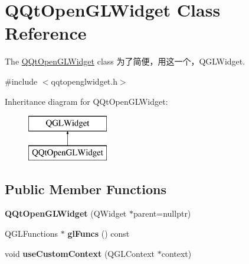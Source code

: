 \hypertarget{class_q_qt_open_g_l_widget}{}\section{Q\+Qt\+Open\+G\+L\+Widget Class Reference}
\label{class_q_qt_open_g_l_widget}


The \mbox{\hyperlink{class_q_qt_open_g_l_widget}{Q\+Qt\+Open\+G\+L\+Widget}} class 为了简便，用这一个，\+Q\+G\+L\+Widget.  




{\ttfamily \#include $<$qqtopenglwidget.\+h$>$}

Inheritance diagram for Q\+Qt\+Open\+G\+L\+Widget\+:\begin{figure}[H]
\begin{center}
\leavevmode
\includegraphics[height=2.000000cm]{class_q_qt_open_g_l_widget}
\end{center}
\end{figure}
\subsection*{Public Member Functions}
\begin{DoxyCompactItemize}
\item 
\mbox{\label{class_q_qt_open_g_l_widget_ac7b852b2db5b23e1d47147fc0faafb50}} 
{\bfseries Q\+Qt\+Open\+G\+L\+Widget} (Q\+Widget $\ast$parent=nullptr)
\item 
\mbox{\label{class_q_qt_open_g_l_widget_a0d2ea963f768cad188417d02e9f1a04e}} 
Q\+G\+L\+Functions $\ast$ {\bfseries gl\+Funcs} () const
\item 
\mbox{\label{class_q_qt_open_g_l_widget_a77c72ece8c9ca8bcef1c7881f60f1abf}} 
void {\bfseries use\+Custom\+Context} (Q\+G\+L\+Context $\ast$context)
\end{DoxyCompactItemize}
